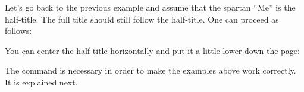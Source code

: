 \begin{Example}
  Let's go back to the previous example and assume
  that the spartan ``Me'' is the half-title. The full title should
  still follow the half-title. One can proceed as follows:
\ifCommonmaincls
{}
\else
\fi
  You can center the half-title horizontally and put it a little lower down
  the page:
\ifCommonmaincls
{}
\else
  \fi%
  The command  is necessary in order to make
  the examples above work correctly. It is explained next.
\end{Example}
%


